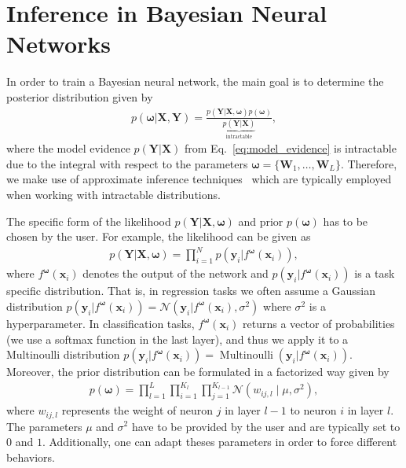 \documentclass[runningheads]{llncs}
\begin{document}
\section{Inference in Bayesian Neural Networks}
\label{sec:inference_in_bnn}
In order to train a Bayesian neural network, the main goal is to determine the posterior distribution given by
\begin{align*}
    p\left(\boldsymbol{\omega} | \mathbf{X}, \mathbf{Y} \right) = \frac{p(\mathbf{Y} | \mathbf{X}, \boldsymbol{\omega})p\left(\boldsymbol{\omega}\right)}{\underbrace{p\left(\mathbf{Y} | \mathbf{X}\right)}_{\text{intractable}}},
\end{align*}
where the model evidence $p(\mathbf{Y}|\mathbf{X})$ from  Eq.~\ref{eq:model_evidence} is intractable due to the integral with respect to the parameters $\boldsymbol{\omega} = \{\mathbf{W}_1, \ldots,\mathbf{W}_L\}$.
Therefore, we make use of approximate inference techniques~\cite{Gal2016Uncertainty} which are typically employed when working with intractable distributions. 

The specific form of the likelihood $p(\mathbf{Y} | \mathbf{X}, \boldsymbol{\omega})$ and prior $p\left(\boldsymbol{\omega}\right)$ has to be chosen by the user.
For example, the likelihood can be given as
\begin{align}
    p(\mathbf{Y} | \mathbf{X}, \boldsymbol{\omega}) = \prod_{i=1}^N p\left(\mathbf{y}_i | f^{\boldsymbol{\omega}}(\mathbf{x}_i) \right),
\end{align}
where $f^{\boldsymbol{\omega}}(\mathbf{x}_i)$ denotes the output of the network and $p\left(\mathbf{y}_i|f^{\boldsymbol{\omega}}(\mathbf{x}_i)\right)$ is a task specific distribution.
That is, in regression tasks we often assume a Gaussian distribution $p\left(\mathbf{y}_i|f^{\boldsymbol{\omega}}(\mathbf{x}_i)\right) = \mathcal{N}\left(\mathbf{y}_i | f^{\boldsymbol{\omega}}(\mathbf{x}_i) , \sigma^2 \right)$ where $\sigma^2$ is a hyperparameter.
In classification tasks, $f^{\boldsymbol{\omega}}(\mathbf{x}_i)$ returns a vector of probabilities (we use a softmax function in the last layer), and thus we apply it to a Multinoulli distribution $p\left(\mathbf{y}_i|f^{\boldsymbol{\omega}}(\mathbf{x}_i)\right) = \operatorname{Multinoulli}(\mathbf{y}_i |f^{\boldsymbol{\omega}}(\mathbf{x}_i))$.
Moreover, the prior distribution can be formulated in a factorized way given by
\begin{align}
    p\left(\boldsymbol{\omega}\right)=\prod_{l = 1}^{L}\prod_{i=1}^{K_{l}}\prod_{j=1}^{K_{l-1}} \mathcal{N} \left(w_{ij, l} \mid \mu, \sigma^2\right), \label{eq:prior_factorized}
\end{align}
where $w_{ij,l}$ represents the weight of neuron $j$ in layer $l-1$ to neuron $i$ in layer $l$. The parameters $\mu$ and $\sigma^2$ have to be provided by the user and are typically set to $0$ and $1$.
Additionally, one can adapt theses parameters in order to force different behaviors. 
\end{document}
